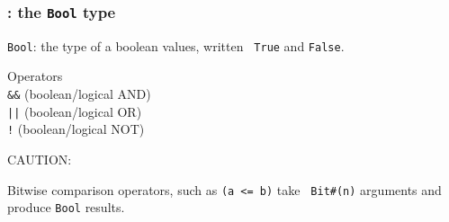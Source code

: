 
\begin{frame}[fragile]
\frametitle{{\BSV}: the {\tt Bool} type}

\footnotesize

\verb|Bool|: the type of a boolean values, written {\tt
True} and {\tt False}.

\vspace{1ex}

Operators \\
\hmmmm \verb|&&| (boolean/logical AND) \\
\hmmmm \verb'||' (boolean/logical OR)  \\
\hmmmm \verb|!| (boolean/logical NOT)  \\

\vspace{10ex}

CAUTION: 

\vspace{2ex}

Bitwise comparison operators, such as {\tt (a <= b)} take {\tt
Bit\#(n)} arguments and produce {\tt Bool} results.


\end{frame}


